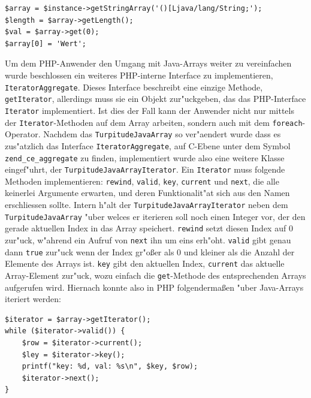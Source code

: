 \begin{lstlisting}[caption=Zugriff auf ein Java-Array]
$array = $instance->getStringArray('()[Ljava/lang/String;');
$length = $array->getLength();
$val = $array->get(0);
$array[0] = 'Wert';
\end{lstlisting}

Um dem PHP-Anwender den Umgang mit Java-Arrays weiter zu vereinfachen wurde beschlossen ein weiteres PHP-interne Interface zu implementieren, \texttt{IteratorAggregate}.
Dieses Interface beschreibt eine einzige Methode, \texttt{getIterator}, allerdings muss sie ein Objekt zur"uckgeben, das das PHP-Interface \texttt{Iterator} implementiert.
Ist dies der Fall kann der Anwender nicht nur mittels der \texttt{Iterator}-Methoden auf dem Array arbeiten, sondern auch mit dem \texttt{foreach}-Operator. Nachdem
das \texttt{TurpitudeJavaArray} so ver"aendert wurde dass es zus"atzlich das Interface \texttt{IteratorAggregate}, auf C-Ebene unter dem Symbol \texttt{zend\_ce\_aggregate}
zu finden, implementiert wurde also eine weitere Klasse eingef"uhrt, der \texttt{TurpitudeJavaArrayIterator}. Ein \texttt{Iterator} muss folgende Methoden implementieren:
\texttt{rewind}, \texttt{valid}, \texttt{key}, \texttt{current} und \texttt{next}, die alle keinerlei Argumente erwarten, und deren Funktionalit"at sich aus den Namen erschliessen 
sollte. Intern h"alt der \texttt{TurpitudeJavaArrayIterator} neben dem \texttt{TurpitudeJavaArray} "uber welces er iterieren soll noch einen Integer vor, der den
gerade aktuellen Index in das Array speichert. \texttt{rewind} setzt diesen Index auf 0 zur"uck, w"ahrend ein Aufruf von \texttt{next} ihn um eins erh"oht. \texttt{valid} gibt
genau dann \texttt{true} zur"uck wenn der Index gr"o\ss er als 0 und kleiner als die Anzahl der Elemente des Arrays ist. \texttt{key} gibt den aktuellen Index, \texttt{current}
das aktuelle Array-Element zur"uck, wozu einfach die \texttt{get}-Methode des entsprechenden Arrays aufgerufen wird. Hiernach konnte also in PHP folgenderma\ss en "uber Java-Arrays
iteriert werden:

\begin{lstlisting}[caption=Iterieren "uber ein Java-Array]
$iterator = $array->getIterator();
while ($iterator->valid()) {
    $row = $iterator->current();
    $ley = $iterator->key();
    printf("key: %d, val: %s\n", $key, $row);
    $iterator->next();
}
\end{lstlisting}

